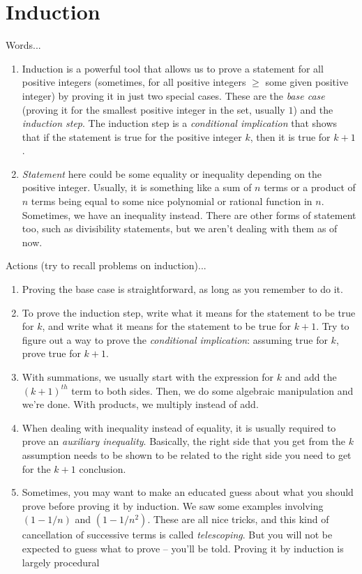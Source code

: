 \documentclass[10pt]{amsart}
\begin{document}
\section{Induction}

Words...

\begin{enumerate}
\item Induction is a powerful tool that allows us to prove a statement
  for all positive integers (sometimes, for all positive integers
  $\ge$ some given positive integer) by proving it in just two special
  cases. These are the {\em base case} (proving it for the smallest
  positive integer in the set, usually $1$) and the {\em induction
  step}. The induction step is a {\em conditional implication} that
  shows that if the statement is true for the positive integer $k$,
  then it is true for $k + 1$.
\item {\em Statement} here could be some equality or inequality
  depending on the positive integer. Usually, it is something like a
  sum of $n$ terms or a product of $n$ terms being equal to some nice
  polynomial or rational function in $n$. Sometimes, we have an
  inequality instead. There are other forms of statement too, such as
  divisibility statements, but we aren't dealing with them as of now.
\end{enumerate}

Actions (try to recall problems on induction)...

\begin{enumerate}

\item Proving the base case is straightforward, as long as you
  remember to do it.
\item To prove the induction step, write what it means for the
  statement to be true for $k$, and write what it means for the
  statement to be true for $k + 1$. Try to figure out a way to prove
  the {\em conditional implication}: assuming true for $k$, prove true
  for $k + 1$.
\item With summations, we usually start with the expression for $k$
  and add the $(k+1)^{th}$ term to both sides. Then, we do some
  algebraic manipulation and we're done. With products, we multiply
  instead of add.
\item When dealing with inequality instead of equality, it is usually
  required to prove an {\em auxiliary inequality}. Basically, the
  right side that you get from the $k$ assumption needs to be shown to
  be related to the right side you need to get for the $k + 1$
  conclusion.
\item Sometimes, you may want to make an educated guess about what you
  should prove before proving it by induction. We saw some examples
  involving $(1-1/n)$ and $(1 - 1/n^2)$. These are all nice tricks,
  and this kind of cancellation of successive terms is called {\em
  telescoping}. But you will not be expected to guess what to prove --
  you'll be told. Proving it by induction is largely procedural
\end{enumerate}
\end{document}
